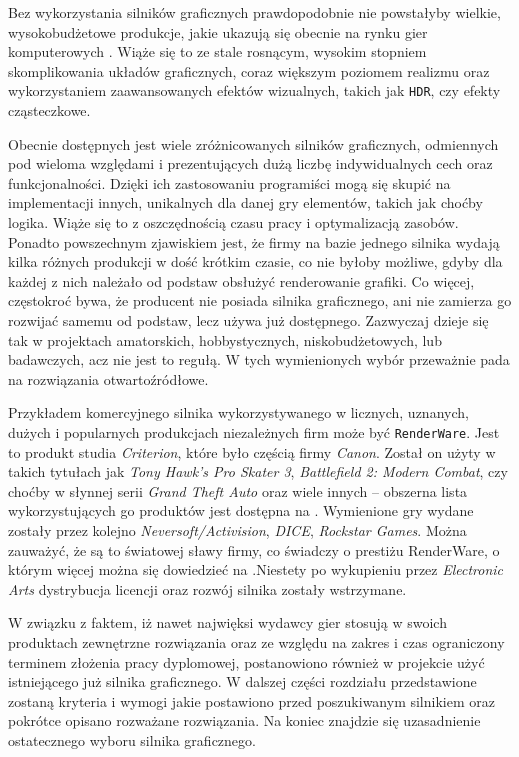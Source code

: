 \documentclass[11pt]{mwrep}
\begin{document}
    Bez wykorzystania silników graficznych prawdopodobnie nie powstałyby wielkie, wy\-so\-ko\-bud\-że\-to\-we produkcje, jakie ukazują się obecnie na rynku gier komputerowych	. Wiąże się to ze stale rosnącym, wysokim stopniem skomplikowania układów graficznych, coraz większym poziomem realizmu oraz wykorzystaniem zaawansowanych efektów wizualnych, takich jak \texttt{HDR}, czy efekty cząsteczkowe. 

    Obecnie dostępnych jest wiele zróżnicowanych silników graficznych, odmiennych pod wieloma względami i prezentujących dużą liczbę indywidualnych cech oraz funkcjonalności. Dzięki ich zastosowaniu programiści mogą się skupić na implementacji innych, unikalnych dla danej gry elementów, takich jak choćby logika. Wiąże się to z oszczędnością czasu pracy i optymalizacją zasobów. Ponadto powszechnym zjawiskiem jest, że firmy na bazie jednego silnika wydają kilka różnych produkcji w dość krótkim czasie, co nie byłoby możliwe, gdyby dla każdej z nich należało od podstaw obsłużyć renderowanie grafiki. Co więcej, częstokroć bywa, że producent nie posiada silnika graficznego, ani nie zamierza go rozwijać samemu od podstaw, lecz używa już dostępnego. Zazwyczaj dzieje się tak w projektach amatorskich, hobbystycznych, niskobudżetowych, lub badawczych, acz nie jest to regułą. W tych wymienionych wybór przeważnie pada na rozwiązania otwartoźródłowe.

    Przykładem komercyjnego silnika wykorzystywanego w licznych, uznanych, dużych i popularnych produkcjach niezależnych firm może być \texttt{RenderWare}. Jest to produkt studia \textit{Criterion}, które było częścią firmy \textit{Canon}. Został on użyty w takich tytułach jak \textit{Tony Hawk's Pro Skater 3}, \textit{Battlefield 2: Modern Combat}, czy choćby w słynnej serii \textit{Grand Theft Auto} oraz wiele innych -- obszerna lista wykorzystujących go produktów jest dostępna na \cite{renderware:list}. Wymienione gry wydane zostały przez kolejno  \textit{Neversoft/Activision}, \textit{DICE}, \textit{Rockstar Games}. Można zauważyć, że są to światowej sławy firmy, co świadczy o prestiżu RenderWare, o którym więcej można się dowiedzieć na \cite{renderware}.Niestety po wykupieniu przez \textit{Electronic Arts} dystrybucja licencji oraz rozwój silnika zostały wstrzymane.


    W związku z faktem, iż nawet najwięksi wydawcy gier stosują w swoich produktach zewnętrzne rozwiązania oraz ze względu na zakres i czas ograniczony terminem złożenia pracy dyplomowej, postanowiono również w projekcie użyć istniejącego już silnika graficznego. W dalszej części rozdziału przedstawione zostaną kryteria i wymogi jakie postawiono przed poszukiwanym silnikiem oraz pokrótce opisano rozważane rozwiązania. Na koniec znajdzie się uzasadnienie ostatecznego wyboru silnika graficznego.
\end{document}
